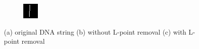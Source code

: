 \documentclass{article}
\begin{document}
\begin{figure}[H]
\begin{subfigure}[b]{0.32\textwidth}
		\caption{}
		\label{fig:critical2DenPhi}
	\end{subfigure}
	\begin{subfigure}[b]{0.32\textwidth}
		\includegraphics[width=\linewidth]{critical3}
		\caption{}
		\label{fig:critical3DenPhi}
	\end{subfigure}
	\captionsetup{justification=centering}
	\caption{(a) original DNA string (b) without L-point removal (c) with L-point removal}
	\label{fig:criticalDenPhi} %
\end{figure}
\end{document}
